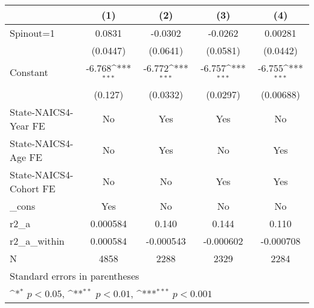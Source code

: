 {
\def\sym#1{\ifmmode^{#1}\else\(^{#1}\)\fi}
\begin{tabular}{l*{4}{c}}
\hline\hline
                    &\multicolumn{1}{c}{(1)}         &\multicolumn{1}{c}{(2)}         &\multicolumn{1}{c}{(3)}         &\multicolumn{1}{c}{(4)}         \\
\hline
Spinout=1           &      0.0831         &     -0.0302         &     -0.0262         &     0.00281         \\
                    &    (0.0447)         &    (0.0641)         &    (0.0581)         &    (0.0442)         \\
[1em]
Constant            &      -6.768\sym{***}&      -6.772\sym{***}&      -6.757\sym{***}&      -6.755\sym{***}\\
                    &     (0.127)         &    (0.0332)         &    (0.0297)         &   (0.00688)         \\
[1em]
State-NAICS4-Year FE&          No         &         Yes         &         Yes         &          No         \\
[1em]
State-NAICS4-Age FE &          No         &         Yes         &          No         &         Yes         \\
[1em]
State-NAICS4-Cohort FE&          No         &          No         &         Yes         &         Yes         \\
[1em]
\_cons              &         Yes         &          No         &          No         &          No         \\
\hline
r2\_a                &    0.000584         &       0.140         &       0.144         &       0.110         \\
r2\_a\_within         &    0.000584         &   -0.000543         &   -0.000602         &   -0.000708         \\
N                   &        4858         &        2288         &        2329         &        2284         \\
\hline\hline
\multicolumn{5}{l}{\footnotesize Standard errors in parentheses}\\
\multicolumn{5}{l}{\footnotesize \sym{*} \(p<0.05\), \sym{**} \(p<0.01\), \sym{***} \(p<0.001\)}\\
\end{tabular}
}
